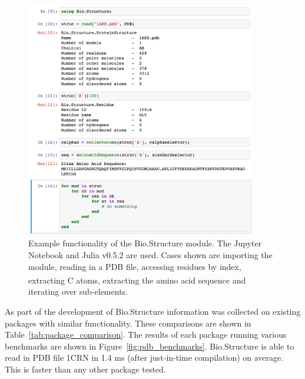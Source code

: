 \begin{figure}
\centering

\includegraphics[width=0.9\textwidth]{figures/biojulia_example/biojulia_example}

\caption[Example functionality of the Bio.Structure module in the Jupyter Notebook]
{Example functionality of the Bio.Structure module.
The Jupyter Notebook and Julia v0.5.2 are used.
Cases shown are importing the module, reading in a PDB file, accessing residues by index, extracting C\textsuperscript{\textalpha} atoms, extracting the amino acid sequence and iterating over sub-elements.}

\label{fig:biojulia_example}
\end{figure}


As part of the development of Bio.Structure information was collected on existing packages with similar functionality.
These comparisons are shown in Table~\ref{tab:package_comparison}.
The results of each package running various benchmarks are shown in Figure~\ref{fig:pdb_benchmarks}.
Bio.Structure is able to read in PDB file 1CRN in 1.4 ms (after just-in-time compilation) on average.
This is faster than any other package tested.


